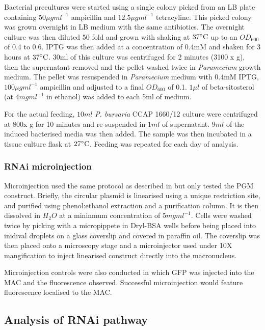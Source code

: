 Bacterial precultures were started using a single colony picked from an LB
plate containing \(50\mu gml^{-1}\) ampicillin and \(12.5\mu g ml^{-1}\) tetracyline.
This picked colony was grown overnight in LB medium with the same antibiotics.
The overnight culture was then diluted 50 fold and grown with shaking
at \(37\celsius\) up to an \(OD_{600}\) of 0.4 to 0.6. IPTG
was then added at a concentration of 0.4mM and shaken for 3 hours
at \(37\celsius\).  30ml of this culture was centrifuged for 2 minutes (3100 x g),
then the supernatant removed and the pellet washed twice in \textit{Paramecium}
growth medium. The pellet was resuspended in \textit{Paramecium} medium with 0.4mM IPTG,
\(100\mu g ml^{-1}\) ampicillin and adjusted to a final \(OD_{600}\) of 0.1.
\(1 \mu l\) of beta-sitosterol (at \(4mg ml^{-1}\) in ethanol) was added
to each 5ml of medium.

For the actual feeding, \(10ml\) \textit{P. bursaria} CCAP 1660/12 culture
were centrifuged at 800x g for 10 minutes and re-suspended in \(1ml\) of supernatant.
\(9ml\) of the induced bacterised media was then added.  The sample was
then incubated in a tissue culture flask at \(27\celsius\).
Feeding was repeated for each day of analysis. 

\subsubsection{RNAi microinjection}

Microinjection used the same protocol as described in \citep{Beisson2010b} 
but only tested the PGM construct.
Briefly, the circular plasmid is linearised using a unique restriction site,
and purified using phenol:ethanol extraction and a purification column.
It is then dissolved in \(H_{2}O\) at a mininmum concentration of 
\(5mg ml^{-1}\).
Cells were washed twice by picking with a micropippete in Dryl-BSA wells before
being placed into inidival droplets on a glass coverslip and covered in paraffin oil.
The coverslip was then placed onto a microscopy stage and a microinjector 
used under 10X mangification to inject linearised construct directly into the
macronucleus.

Microinjection controls were also conducted in which GFP was injected
into the MAC and the fluorescence observed.  Successful microinjection
would feature fluorescence localised to the MAC.

\subsection{Analysis of RNAi pathway}

